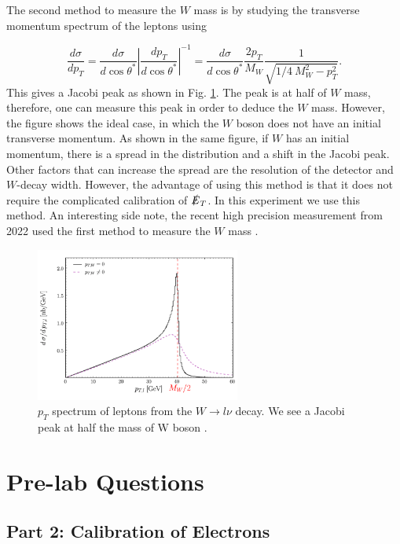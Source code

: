 \documentclass[a4paper]{report}
\numberwithin{equation}{section}
\begin{document}
The second method to measure the $W$ mass is by studying the transverse momentum spectrum of the leptons using

\begin{equation}
	\frac{d \sigma}{d p_T} = \frac{d \sigma}{d \cos \theta ^*} \left| \frac{d p_T}{d \cos \theta ^*} \right| ^{-1} = \frac{d \sigma}{d \cos \theta ^*} \frac{2p_T}{M_W} \frac{1}{\sqrt{1/4 \ M_W^2 - p_T^2}}.
\end{equation}
This gives a Jacobi peak as shown in Fig. \ref{fig:jacobi}. The peak is at half of $W$ mass, therefore, one can measure this peak in order to deduce the $W$ mass. However, the figure shows the ideal case, in which the $W$ boson does not have an initial transverse momentum. As shown in the same figure, if $W$ has an initial momentum, there is a spread in the distribution and a shift in the Jacobi peak. Other factors that can increase the spread are the resolution of the detector and $W$-decay width. However, the advantage of using this method is that it does not require the complicated calibration of $\slashed{E}_T$. In this experiment we use this method. An interesting side note, the recent high precision measurement from 2022 used the first method to measure the $W$ mass \cite{CDF:2022hxs}.


\begin{figure}[htpb]
    \centering
    \includegraphics[width=0.6\textwidth]{jacobi}
    \caption{$p_T$ spectrum of leptons from the $W \rightarrow l \nu$ decay. We see a Jacobi peak at half the mass of W boson \cite{jacobi}.}
    \label{fig:jacobi}
\end{figure}


\chapter{Pre-lab Questions} \label{chap:prelab}

\section{Part 2: Calibration of Electrons}
\end{document}
